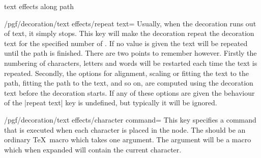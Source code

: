 \begin{decoration}{text effects along path}
\begin{codeexample}[preamble={\usetikzlibrary{decorations.text}}]
\end{codeexample}

    \begin{key}{/pgf/decoration/text effects/repeat text=}
        Usually, when the decoration runs out of text, it simply stops. This
        key will make the decoration repeat the decoration text for the
        specified number of . If no value is given the text will be
        repeated until the path is finished. There are two points to remember
        however. Firstly the numbering of characters, letters and words will be
        restarted each time the text is repeated. Secondly, the options for
        alignment, scaling or fitting the text to the path, fitting the path to
        the text, and so on, are computed using the decoration text before the
        decoration starts. If any of these options are given the behaviour of
        the |repeat text| key is undefined, but typically it will be ignored.
\begin{codeexample}[preamble={\usetikzlibrary{decorations.text}}]
\end{codeexample}
    \end{key}

    \begin{key}{/pgf/decoration/text effects/character command=}
        This key specifies a command that is executed when each character is
        placed in the node. The  should be an ordinary \TeX\ macro
        which takes one argument. The argument will be a macro which when
        expanded will contain the current character.
\begin{codeexample}[preamble={\usetikzlibrary{decorations.text}}]
\def\mycommand#1{#1$_\n$}
\begin{tikzpicture}[decoration={text effects along path,
  text={text effects along path!},
  text effects/.cd,
    path from text, path from text angle=60, group letters,
    word count=\n,
    every word/.style={character command=\mycommand},
    characters={text along path}}]


\end{tikzpicture}
\end{codeexample}
\end{key}
\end{decoration}
